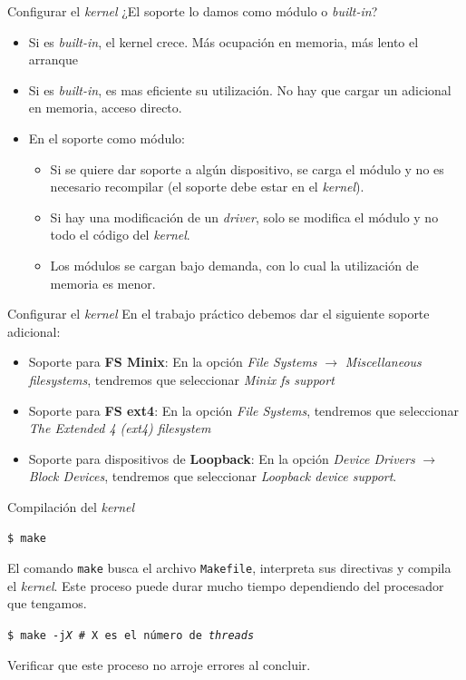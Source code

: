 \begin{frame}{Configurar el \textit{kernel}}
¿El soporte lo damos como módulo o \textit{built-in}?
\pause
\begin{itemize}
\item Si es \textit{built-in}, el kernel crece. Más ocupación en memoria, más lento el arranque
\item Si es \textit{built-in}, es mas eficiente su utilización. No hay que
  cargar un adicional en memoria, acceso directo.
\item En el soporte como módulo:
  \begin{itemize}
  \item Si se quiere dar soporte a algún dispositivo, se carga el módulo y
    no es necesario recompilar (el soporte debe estar en el
    \textit{kernel}).

  \item Si hay una modificación de un \textit{driver}, solo se modifica el
    módulo y no todo el código del \textit{kernel}.

  \item Los módulos se cargan bajo demanda, con lo cual la utilización de
    memoria es menor.
  \end{itemize}
\end{itemize}
\end{frame}

\begin{frame}{Configurar el \textit{kernel}}
  En el trabajo práctico debemos dar el siguiente soporte adicional:
  \begin{itemize}

  \item Soporte para \textbf{FS Minix}: En la opción \textit{File Systems}
    $\to$ \textit{Miscellaneous filesystems}, tendremos que seleccionar
    \textit{Minix fs support}

  \item Soporte para \textbf{FS ext4}: En la opción \textit{File Systems},
    tendremos que seleccionar \textit{The Extended 4 (ext4) filesystem}

  \item Soporte para dispositivos de \textbf{Loopback}: En la opción
    \textit{Device Drivers} $\to$ \textit{Block Devices}, tendremos que
    seleccionar \textit{Loopback device support}.
  \end{itemize}
\end{frame}

\begin{frame}{Compilación del \textit{kernel}}
\begin{block}{}
  \texttt{\$ make} 
\end{block}
El comando \texttt{make} busca el archivo \texttt{Makefile}, interpreta sus
directivas y compila el \textit{kernel}. Este proceso puede durar mucho
tiempo dependiendo del procesador que tengamos.

\begin{block}{}
\texttt{\$ make -j\textit{X} \# X es el número de \textit{threads}}
\end{block}

Verificar que este proceso no arroje errores al concluir.
\end{frame}

